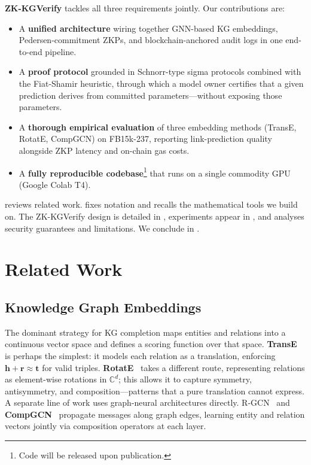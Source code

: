 \documentclass[conference, 10pt]{IEEEtran}
\newcommand{\C}{\mathbb{C}}
\newcommand{\rel}{\mathbf{r}}
\newcommand{\ent}{\mathbf{h}}
\newcommand{\tail}{\mathbf{t}}
\begin{document}
\textbf{ZK-KGVerify} tackles all three requirements jointly. Our contributions are:

\begin{itemize}
    \item A \textbf{unified architecture} wiring together GNN-based KG embeddings, Pedersen-commitment ZKPs, and blockchain-anchored audit logs in one end-to-end pipeline.
    \item A \textbf{proof protocol} grounded in Schnorr-type sigma protocols combined with the Fiat-Shamir heuristic, through which a model owner certifies that a given prediction derives from committed parameters---without exposing those parameters.
    \item A \textbf{thorough empirical evaluation} of three embedding methods (TransE, RotatE, CompGCN) on FB15k-237, reporting link-prediction quality alongside ZKP latency and on-chain gas costs.
    \item A \textbf{fully reproducible codebase}\footnote{Code will be released upon publication.} that runs on a single commodity GPU (Google Colab T4).
\end{itemize}

 reviews related work.  fixes notation and recalls the mathematical tools we build on. The ZK-KGVerify design is detailed in , experiments appear in , and  analyses security guarantees and limitations. We conclude in .

\section{Related Work}
\label{sec:related_work}

\subsection{Knowledge Graph Embeddings}

The dominant strategy for KG completion maps entities and relations into a continuous vector space and defines a scoring function over that space. \textbf{TransE}~\cite{bordes2013translating} is perhaps the simplest: it models each relation as a translation, enforcing $\ent + \rel \approx \tail$ for valid triples. \textbf{RotatE}~\cite{sun2019rotate} takes a different route, representing relations as element-wise rotations in $\C^d$; this allows it to capture symmetry, antisymmetry, and composition---patterns that a pure translation cannot express. A separate line of work uses graph-neural architectures directly. R-GCN~\cite{schlichtkrull2018modeling} and \textbf{CompGCN}~\cite{vashishth2020composition} propagate messages along graph edges, learning entity and relation vectors jointly via composition operators at each layer.
\end{document}
